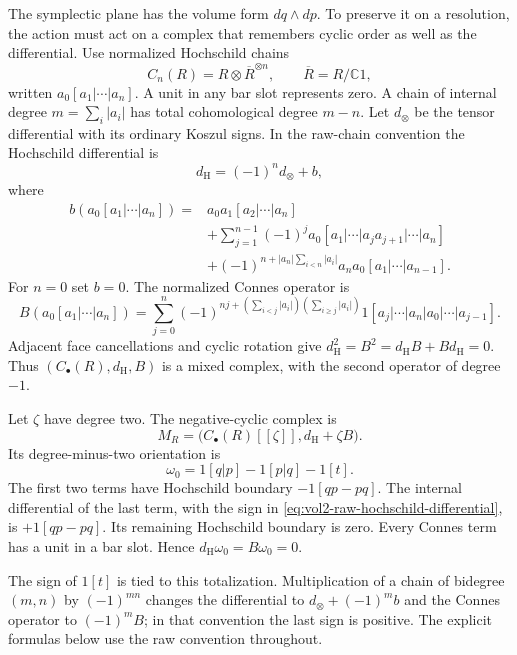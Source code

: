 The symplectic plane has the volume form $dq\wedge dp$.
To preserve it on a resolution, the action must act on a complex
that remembers cyclic order as well as the differential.
Use normalized Hochschild chains
\[
 C_n(R)=R\otimes\overline R^{\otimes n},\qquad
 \overline R=R/\mathbb C1,
\]
written $a_0[a_1|\cdots|a_n]$. A unit in any bar slot represents
zero. A chain of internal degree $m=\sum_i|a_i|$ has total
cohomological degree $m-n$. Let $d_\otimes$ be the tensor
differential with its ordinary Koszul signs. In the raw-chain
convention the Hochschild differential is
\begin{equation}\label{eq:vol2-raw-hochschild-differential}
 d_{\mathrm H}=(-1)^n d_\otimes+b,
\end{equation}
where
\begin{align*}
 b(a_0[a_1|\cdots|a_n])
  ={}&a_0a_1[a_2|\cdots|a_n]\\
    &+\sum_{j=1}^{n-1}(-1)^j
        a_0[a_1|\cdots|a_ja_{j+1}|\cdots|a_n]\\
    &+(-1)^{n+|a_n|\sum_{i<n}|a_i|}
        a_na_0[a_1|\cdots|a_{n-1}].
\end{align*}
For $n=0$ set $b=0$. The normalized Connes operator is
\begin{equation}\label{eq:vol2-raw-connes-operator}
 B(a_0[a_1|\cdots|a_n])
 =\sum_{j=0}^n
 (-1)^{nj+(\sum_{i<j}|a_i|)(\sum_{i\geq j}|a_i|)}
 1[a_j|\cdots|a_n|a_0|\cdots|a_{j-1}].
\end{equation}
Adjacent face cancellations and cyclic rotation give
$d_{\mathrm H}^2=B^2=d_{\mathrm H}B+Bd_{\mathrm H}=0$.
Thus $(C_\bullet(R),d_{\mathrm H},B)$ is a mixed complex,
with the second operator of degree $-1$.

Let $\zeta$ have degree two. The negative-cyclic complex is
\[
 M_R=\bigl(C_\bullet(R)[[\zeta]],d_{\mathrm H}+\zeta B\bigr).
\]
Its degree-minus-two orientation is
\begin{equation}\label{eq:vol2-raw-orientation-cycle}
 \omega_0=1[q|p]-1[p|q]-1[t].
\end{equation}
The first two terms have Hochschild boundary $-1[qp-pq]$.
The internal differential of the last term, with the sign in
\eqref{eq:vol2-raw-hochschild-differential}, is $+1[qp-pq]$.
Its remaining Hochschild boundary is zero. Every Connes term
has a unit in a bar slot. Hence
$d_{\mathrm H}\omega_0=B\omega_0=0$.

The sign of $1[t]$ is tied to this totalization. Multiplication
of a chain of bidegree $(m,n)$ by $(-1)^{mn}$ changes the
differential to $d_\otimes+(-1)^m b$ and the Connes operator
to $(-1)^mB$; in that convention the last sign is positive.
The explicit formulas below use the raw convention throughout.


